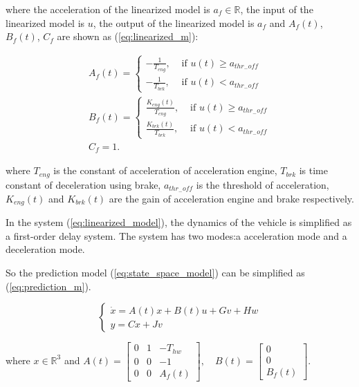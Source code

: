 \documentclass{article}
\numberwithin{equation}{section}
\begin{document}
\noindent where the acceleration of the linearized model is $a_f\in \mathbb{R}$, the input of the
linearized model is $u$, the output of the linearized model is $a_f$ and $A_f(t)$, $B_f(t)$, $C_f$ are
shown as (\ref{eq:linearized_m}):

\begin{equation}
    \begin{array}{l}\label{eq:linearized_m}
    A_{f}(t)=\left\{\begin{array}{ll}
    -\frac{1}{T_{e n g}}, & \text { if } u(t) \geq a_{t h r_{-} o f f} \\
    -\frac{1}{T_{b r k}}, & \text { if } u(t)<a_{t h r_{-} o f f}
    \end{array}\right. \\
    B_{f}(t)=\left\{\begin{array}{ll}
    \frac{K_{e n g}(t)}{T_{e n g}}, & \text { if } u(t) \geq a_{t h r_{-} o f f} \\
    \frac{K_{b r k}(t)}{T_{b r k}}, & \text { if } u(t)<a_{t h r_{-} o f f}
    \end{array}\right. \\
    C_{f}=1 .
    \end{array}
\end{equation}

\noindent where $T_{e n g}$ is the constant of acceleration of acceleration engine, 
$T_{b r k}$ is time constant of deceleration using brake, $a_{t h r_{-} o f f}$ is the threshold
of acceleration, $K_{e n g}(t)$ and $K_{b r k}(t)$ are the gain of acceleration engine and brake
respectively.

In the system (\ref{eq:linearized_model}), the dynamics of the vehicle is simplified as a first-order
delay system. The system has two modes:a acceleration mode and a deceleration mode. 

So the prediction model (\ref{eq:state_space_model}) can be simplified as (\ref{eq:prediction_m}).

\begin{equation}
    \left\{\begin{array}{l}\label{eq:prediction_m}
        \dot{x}=A(t)x+B(t)u+Gv+Hw \\
        y=Cx+Jv
        \end{array}\right.
\end{equation}

\noindent where $x \in \mathbb{R}^3$ and $A(t)=\left[\begin{array}{ccc}
    0 & 1 & -T_{h w} \\
    0 & 0 & -1 \\
    0 & 0 & A_{f}(t)
    \end{array}\right], \quad B(t)=\left[\begin{array}{c}
    0 \\
    0 \\
    B_{f}(t)
    \end{array}\right]$.
\end{document}
